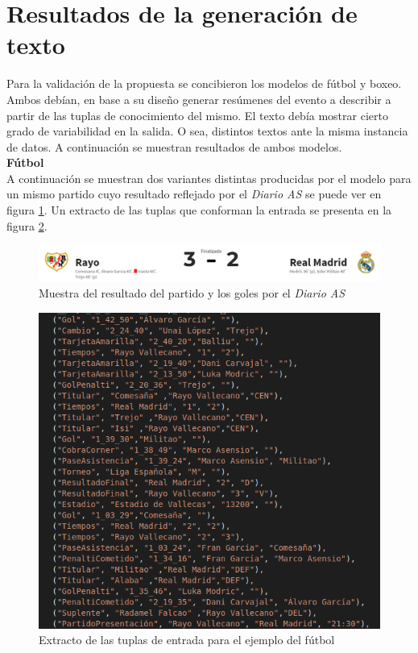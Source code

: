 \section{Resultados de la generación de texto}

    Para la validación de la propuesta se concibieron los modelos de fútbol y boxeo. Ambos debían, en base a su diseño 
generar resúmenes del evento a describir a partir de las tuplas de conocimiento del mismo. El texto debía mostrar cierto grado 
de variabilidad en la salida. O sea, distintos textos ante la misma instancia de datos. A continuación se muestran resultados de 
ambos modelos.\\

    \textbf{Fútbol}\\

  A continuación se muestran  dos variantes distintas producidas por el modelo para un mismo partido cuyo resultado reflejado por el 
\textit{Diario AS} se puede ver en figura \ref{fig_rayomadrid}. Un extracto de las tuplas que conforman la entrada se presenta en la 
figura \ref{fig_entradafutbol}.

\begin{figure}[!]
    \begin{center}
        \includegraphics[scale=0.4]{Graphics/rayomadrid.png}
    \end{center}
    \caption{Muestra del resultado del partido y los goles por el \textit{Diario AS}}
    \label{fig_rayomadrid}
\end{figure}

\begin{figure}[!]
    \begin{center}
        \includegraphics[scale=0.4]{Graphics/entradafutbol.png}
    \end{center}
    \caption{Extracto de las tuplas de entrada para el ejemplo del fútbol}
    \label{fig_entradafutbol}
\end{figure}

